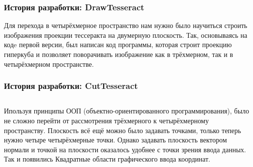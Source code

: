 \documentclass[10pt,pdf,hyperref={unicode}]{beamer}
\begin{document}
\begin{frame}
\frametitle{История разработки: {\bf DrawTesseract}}
	Для перехода в четырёхмерное пространство нам нужно 
	было научиться строить изображения проекции тессеракта на двумерную плоскость.
	Так, основываясь на кодe первой версии, был написан код программы, которая строит
	проекцию гиперкуба и позволяет поворачивать изображение как в трёхмерном, так и 
	в четырёхмерном пространстве.
\end{frame}

\begin{frame}
\frametitle{История разработки: {\bf CutTesseract}}
	\begin{columns}
		Ипользуя принципы ООП (объектно-ориентированного программирования),
		было не сложно перейти от рассмотрения трёхмерного к четырёхмерному
		пространству. Плоскость всё ещё можно было задавать точками,
		только теперь нужно четыре четырёхмерные точки. Однако 
		задавать плоскость вектором нормали и точкой на плоскости 
		оказалось удобнее с точки зрения ввода данных.	Так 
		и появились Квадратные области графического ввода координат.
	\end{columns}
\end{frame}
\end{document}
